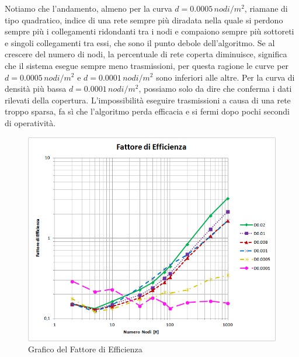 Notiamo che l'andamento, almeno per la curva $d=0.0005\, nodi/m^2$, riamane di tipo quadratico, indice di una rete sempre più diradata nella quale si perdono sempre più i collegamenti ridondanti tra i nodi e compaiono sempre più sottoreti e singoli collegamenti tra essi, che sono il punto debole dell'algoritmo. Se al crescere del numero di nodi, la percentuale di rete coperta diminuisce, significa che il sistema esegue sempre meno trasmissioni, per questa ragione le curve per $d=0.0005\, nodi/m^2$ e $d=0.0001\, nodi/m^2$ sono inferiori alle altre. Per la curva di densità più bassa $d=0.0001\, nodi/m^2$, possiamo solo da dire che conferma i dati rilevati della copertura. L'impossibilità eseguire trasmissioni a causa di una rete troppo sparsa, fa sì che l'algoritmo perda efficacia e si fermi dopo pochi secondi di operatività.

\begin{figure}[t]
	\centering
	\includegraphics[width=0.9\linewidth]{"Images/risultati/fattore di efficienza_log"}
	\caption[Fattore di Efficienza]{Grafico del Fattore di Efficienza}
	\label{fig:fattorediefficienza_log}
\end{figure}

